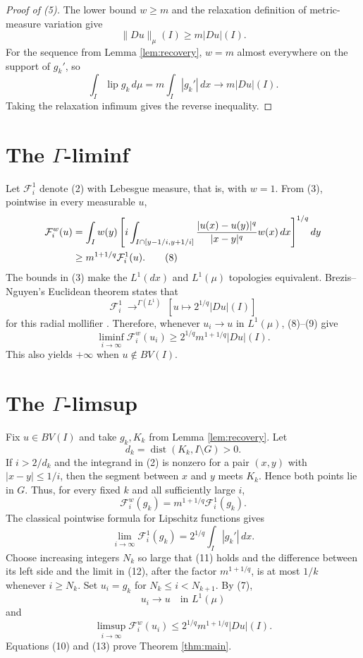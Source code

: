 \documentclass[11pt]{article}
\newcommand{\F}{\mathcal F}
\begin{document}
\begin{proof}[Proof of (5)]
The lower bound \(w\ge m\) and the relaxation definition of
metric-measure variation give
\[
 \|Du\|_\mu(I)\ge m|Du|(I).
\]
For the sequence from Lemma \ref{lem:recovery}, \(w=m\) almost
everywhere on the support of \(g_k'\), so
\[
 \int_I \operatorname{lip}g_k\,d\mu
 =m\int_I|g_k'|\,dx\longrightarrow m|Du|(I).
\]
Taking the relaxation infimum gives the reverse inequality.
\end{proof}

\section{The \texorpdfstring{\(\Gamma\)}{Gamma}-liminf}

Let \(\F_i^1\) denote (2) with Lebesgue measure, that is, with \(w=1\).
From (3), pointwise in every measurable \(u\),
\begin{align}
 \F_i^w(u)
 &=\int_I w(y)\left[
 i\int_{I\cap[y-1/i,y+1/i]}
 \frac{|u(x)-u(y)|^q}{|x-y|^q}w(x)\,dx
 \right]^{1/q}dy \notag\\
 &\ge m^{1+1/q}\F_i^1(u).
 \tag{8}
\end{align}
The bounds in (3) make the \(L^1(dx)\) and \(L^1(\mu)\) topologies
equivalent. Brezis--Nguyen's Euclidean theorem states that
\[
 \F_i^1\ \mathop{\longrightarrow}^{\Gamma(L^1)}\
 \left[u\mapsto2^{1/q}|Du|(I)\right]
 \tag{9}
\]
for this radial mollifier \cite[Proposition 15]{BN}. Therefore, whenever
\(u_i\to u\) in \(L^1(\mu)\), (8)--(9) give
\[
 \liminf_{i\to\infty}\F_i^w(u_i)
 \ge2^{1/q}m^{1+1/q}|Du|(I).
 \tag{10}
\]
This also yields \(+\infty\) when \(u\notin BV(I)\).

\section{The \texorpdfstring{\(\Gamma\)}{Gamma}-limsup}

Fix \(u\in BV(I)\) and take \(g_k,K_k\) from Lemma
\ref{lem:recovery}. Let
\[
 d_k=\operatorname{dist}(K_k,I\setminus G)>0.
\]
If \(i>2/d_k\) and the integrand in (2) is nonzero for a pair
\((x,y)\) with \(|x-y|\le1/i\), then the segment between \(x\) and \(y\)
meets \(K_k\). Hence both points lie in \(G\). Thus, for every fixed
\(k\) and all sufficiently large \(i\),
\begin{equation}
 \F_i^w(g_k)=m^{1+1/q}\F_i^1(g_k).
 \tag{11}
\end{equation}
The classical pointwise formula for Lipschitz functions gives
\[
 \lim_{i\to\infty}\F_i^1(g_k)
 =2^{1/q}\int_I|g_k'|\,dx.
 \tag{12}
\]
Choose increasing integers \(N_k\) so large that (11) holds and the
difference between its left side and the limit in (12), after the
factor \(m^{1+1/q}\), is at most \(1/k\) whenever \(i\ge N_k\).
Set \(u_i=g_k\) for \(N_k\le i<N_{k+1}\). By (7),
\[
 u_i\to u\quad\text{in }L^1(\mu)
\]
and
\[
 \limsup_{i\to\infty}\F_i^w(u_i)
 \le2^{1/q}m^{1+1/q}|Du|(I).
 \tag{13}
\]
Equations (10) and (13) prove Theorem \ref{thm:main}.
\end{document}
